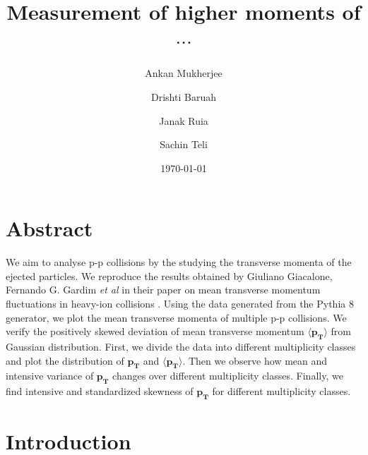\documentclass[letterpaper,aps,prc,superscriptaddress,nofootinbib,10pt,showpacs,floatfix]{revtex4-2}%
\begin{document}
\title{ Measurement of higher moments of   $\cdots$}
\author{Ankan Mukherjee} 
\author{Drishti Baruah}
\author{Janak Ruia}
\author{Sachin Teli}



\date{\today}  



\maketitle

\section*{Abstract}
\begin{adjustwidth}{50pt}{50pt}
We aim to analyse p-p collisions by the studying the transverse momenta of the ejected particles. We reproduce the results obtained by Giuliano Giacalone, Fernando G. Gardim {\it et al} in their paper on mean transverse momentum fluctuations in heavy-ion collisions \cite{fluct}. Using the data generated from the Pythia 8 generator, we plot the mean transverse momenta of multiple p-p collisions. We verify the positively skewed deviation of mean transverse momentum $\mathbf{\langle p_T \rangle}$  from Gaussian distribution. First, we divide the data into different multiplicity classes and plot the distribution of $\mathbf{p_T}$ and $\mathbf{\langle  p_T\rangle}$. Then we observe how mean and intensive variance of $\mathbf{p_T}$ changes over different multiplicity classes. Finally, we find intensive and standardized skewness of $\mathbf{p_T}$ for different multiplicity classes. 
\end{adjustwidth}
\vspace{10pt}
\section{Introduction}
\end{document}
